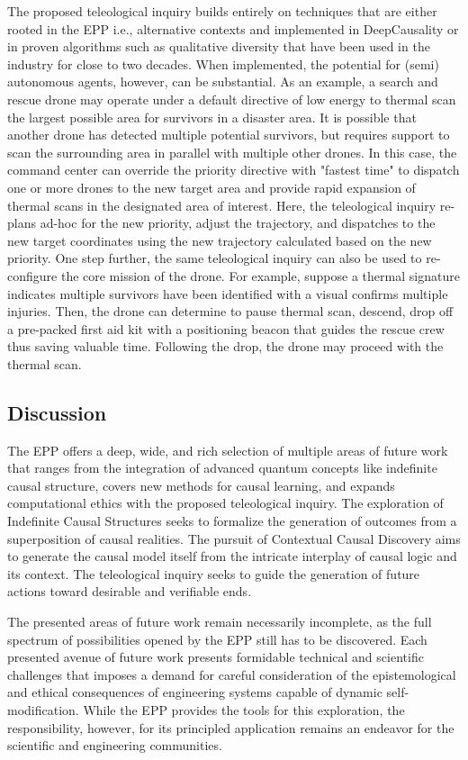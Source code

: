 The proposed teleological inquiry builds entirely on techniques that are either rooted in the EPP i.e., alternative contexts and implemented in DeepCausality or in proven algorithms such as qualitative diversity that have been used in the industry for close to two decades. When implemented, the potential for (semi) autonomous agents, however, can be substantial. As an example, a search and rescue drone may operate under a default directive of low energy to thermal scan the largest possible area for survivors in a disaster area. It is possible that another drone has detected multiple potential survivors, but requires support to scan the surrounding area in parallel with multiple other drones. In this case, the command center can override the priority directive with "fastest time" to dispatch one or more drones to the new target area and provide rapid expansion of thermal scans in the designated area of interest. Here, the teleological inquiry re-plans ad-hoc for the new priority, adjust the trajectory, and dispatches to the new target coordinates using the new trajectory calculated based on the new priority. One step further, the same teleological inquiry can also be used to re-configure the core mission of the drone. For example, suppose a thermal signature indicates multiple survivors have been identified with a visual confirms multiple injuries. Then, the drone can determine to pause thermal scan, descend, drop off a pre-packed first aid kit with a positioning beacon that guides the rescue crew thus saving valuable time. Following the drop, the drone may proceed with the thermal scan.  
  
  \subsection{Discussion}

The EPP offers a deep, wide, and rich selection of multiple areas of future work that ranges from the integration of advanced quantum concepts like indefinite causal structure, covers new methods for causal learning, and expands  computational ethics with the proposed teleological inquiry. The exploration of Indefinite Causal Structures seeks to formalize the generation of outcomes from a superposition of causal realities. The pursuit of Contextual Causal Discovery aims to generate the causal model itself from the intricate interplay of causal logic and its context. The teleological inquiry seeks to guide the generation of future actions toward desirable and verifiable ends. 

The presented areas of future work remain necessarily incomplete, as the full spectrum of possibilities opened by the EPP still has to be discovered. Each presented avenue of future work presents formidable technical and scientific challenges that imposes a demand for careful consideration of the epistemological and ethical consequences of engineering systems capable of dynamic self-modification. While the EPP provides the tools for this exploration, the responsibility, however, for its principled application remains an endeavor for the scientific and engineering communities.


\newpage
